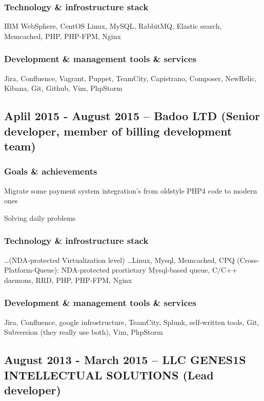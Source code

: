 \documentclass[9pt, a4paper, english]{extarticle}
\begin{document}
    \subsubsection* {Technology \& infrostructure stack}
      IBM WebSphere, CentOS Linux, MySQL, RabbitMQ, Elastic search, Memcached,
      PHP, PHP-FPM, Nginx
    \subsubsection* {Development \& management tools \& services}
      Jira, Confluence, Vagrant, Puppet, TeamCity, Capistrano, Composer,
      NewRelic, Kibana, Git, Github, Vim, PhpStorm


  \subsection* {Aplil 2015 - August 2015 -- \textbf{Badoo LTD} (Senior developer, member of billing development team)}
    \subsubsection* {Goals \& achievements}
      \begin {list}{\textbullet}{\itemsep=0mm}
        \item Migrate some payment system integration's from oldstyle PHP4 code to modern ones
        \item Solving daily problems
      \end{list}
    \subsubsection* {Technology \& infrostructure stack}
      \ldots (NDA-protected Virtualization level) \ldots Linux, Mysql, Memcached,
      CPQ (Cross-Platform-Queue): NDA-protected prortietary Mysql-based queue,
      C/C++ daemons, RRD, PHP, PHP-FPM, Nginx
    \subsubsection* {Development \& management tools \& services}
      Jira, Confluence, google infrostructure, TeamCity, Splunk, self-written
      tools, Git, Subversion (they really use both), Vim, PhpStorm


  \subsection* {August 2013 - March 2015 -- \textbf{LLC GENES1S INTELLECTUAL SOLUTIONS} (Lead developer)}
\end{document}
